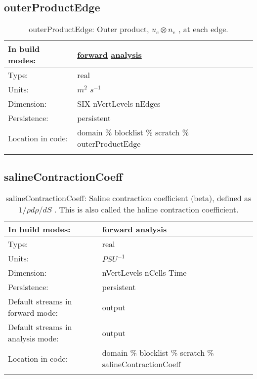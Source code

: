 \subsection[outerProductEdge]{outerProductEdge}
\label{subsec:var_sec_scratch_outerProductEdge}
\begin{center}
\begin{longtable}{| p{2.0in} | p{4.0in} |}
        \hline 
        In build modes: & \hyperref[subsec:forward_var_tab_scratch]{forward} \hyperref[subsec:analysis_var_tab_scratch]{analysis} \\
        \hline 
        Type: & real \\
        \hline 
        Units: & $m^2$ $s^{-1}$ \\
        \hline 
        Dimension: & SIX nVertLevels nEdges \\
        \hline 
        Persistence: & persistent \\
        \hline 
		 Location in code: & domain \% blocklist \% scratch \% outerProductEdge \\
		 \hline 
    \caption{outerProductEdge:  Outer product,  $u_e \otimes n_e$ , at each edge.}
\end{longtable}
\end{center}
\subsection[salineContractionCoeff]{salineContractionCoeff}
\label{subsec:var_sec_scratch_salineContractionCoeff}
\begin{center}
\begin{longtable}{| p{2.0in} | p{4.0in} |}
        \hline 
        In build modes: & \hyperref[subsec:forward_var_tab_scratch]{forward} \hyperref[subsec:analysis_var_tab_scratch]{analysis} \\
        \hline 
        Type: & real \\
        \hline 
        Units: & $PSU^{-1}$ \\
        \hline 
        Dimension: & nVertLevels nCells Time \\
        \hline 
        Persistence: & persistent \\
        \hline 
		 Default streams in forward mode: &  output \\
        \hline 
		 Default streams in analysis mode: &  output \\
        \hline 
		 Location in code: & domain \% blocklist \% scratch \% salineContractionCoeff \\
		 \hline 
    \caption{salineContractionCoeff:  Saline contraction coefficient (beta), defined as  $1/\rho d\rho/dS$ .  This is also called the haline contraction coefficient.}
\end{longtable}
\end{center}
